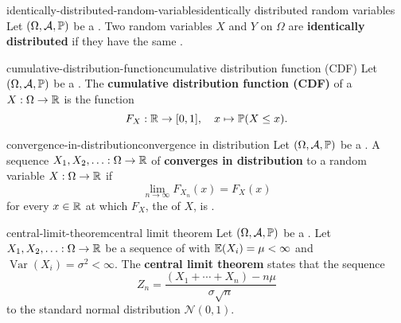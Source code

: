 \begin{topic}{identically-distributed-random-variables}{identically distributed random variables}
    Let $(\Omega, \mathcal{A}, \mathbb{P})$ be a . Two random variables $X$ and $Y$ on $\Omega$ are \textbf{identically distributed} if they have the same .
\end{topic}

\begin{topic}{cumulative-distribution-function}{cumulative distribution function (CDF)}
    Let $(\Omega, \mathcal{A}, \mathbb{P})$ be a . The \textbf{cumulative distribution function (CDF)} of a  $X : \Omega \to \mathbb{R}$ is the function
    \[ F_X : \mathbb{R} \to [0, 1], \quad x \mapsto \mathbb{P}(X \le x) . \]
\end{topic}

\begin{topic}{convergence-in-distribution}{convergence in distribution}
    Let $(\Omega, \mathcal{A}, \mathbb{P})$ be a . A sequence $X_1, X_2, \ldots : \Omega \to \mathbb{R}$ of  \textbf{converges in distribution} to a random variable $X : \Omega \to \mathbb{R}$ if
    \[ \lim_{n \to \infty} F_{X_n}(x) = F_X(x) \]
    for every $x \in \mathbb{R}$ at which $F_X$, the  of $X$, is . 
\end{topic}

\begin{topic}{central-limit-theorem}{central limit theorem}
    Let $(\Omega, \mathcal{A}, \mathbb{P})$ be a . Let $X_1, X_2, \ldots : \Omega \to \mathbb{R}$ be a sequence of    with  $\mathbb{E}(X_i) = \mu < \infty$ and  $\operatorname{Var}(X_i) = \sigma^2 < \infty$. The \textbf{central limit theorem} states that the sequence
    \[ Z_n = \frac{(X_1 + \cdots + X_n) - n \mu}{\sigma \sqrt{n}} \]
     to the standard normal distribution $\mathcal{N}(0, 1)$.
\end{topic}
